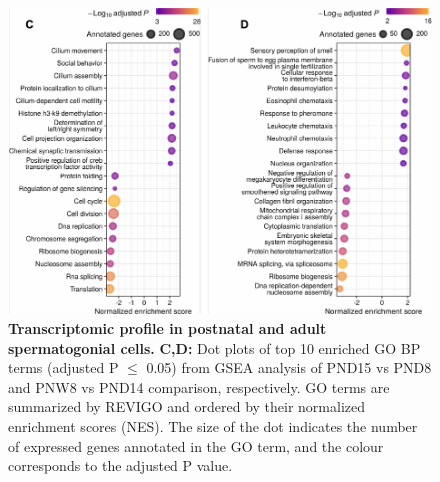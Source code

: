 \documentclass[12pt,twoside]{reedthesis}
\begin{document}
\begin{subfigures}
\begin{figure}[htbp]

{\centering \includegraphics{thesis_files/figure-latex/df2b-1} 

}

\caption[Transcriptomic profile in postnatal and adult spermatogonial cells]{\textbf{Transcriptomic profile in postnatal and adult spermatogonial cells.} \newline \textbf{C,D:} Dot plots of top 10 enriched GO BP terms (adjusted P $\leq$ 0.05) from GSEA analysis of PND15 vs PND8 and PNW8 vs PND14 comparison, respectively. GO terms are summarized by REVIGO and ordered by their normalized enrichment scores (NES). The size of the dot indicates the number of expressed genes annotated in the GO term, and the colour corresponds to the adjusted P value.}\label{fig:df2b}
\end{figure}
\end{subfigures}
\end{document}
